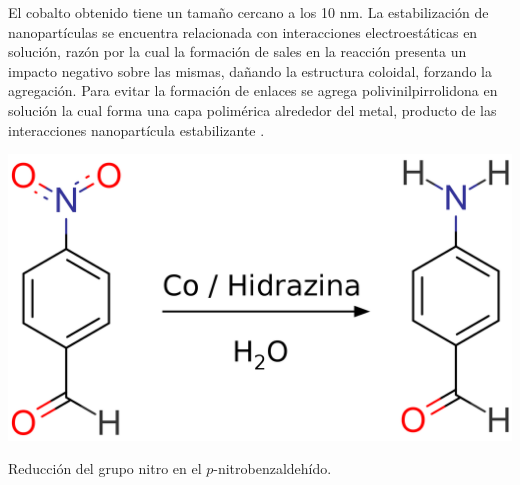 \documentclass[fleqn,10pt]{SelfArx}
\begin{document}
El cobalto obtenido tiene un tama\~no cercano a los 10 nm. La estabilizaci\'on de nanopart\'iculas se encuentra relacionada con interacciones electroest\'aticas en soluci\'on, raz\'on por la cual la formaci\'on de sales en la reacci\'on presenta un impacto negativo sobre las mismas, da\~nando la estructura coloidal, forzando la agregaci\'on. Para evitar la formaci\'on de enlaces  se agrega polivinilpirrolidona en soluci\'on la cual forma una capa polim\'erica alrededor del metal, producto de las interacciones nanopart\'icula estabilizante \cite{wang_qiao_chen_wang_ding_2005}.
\begin{scheme}[h]
	\centering
	\includegraphics[width=0.5\linewidth]{Structures/reduction.png}
	\caption{Reducci\'on del grupo nitro en el $p$-nitrobenzaldeh\'ido.}
\end{scheme}
\end{document}
